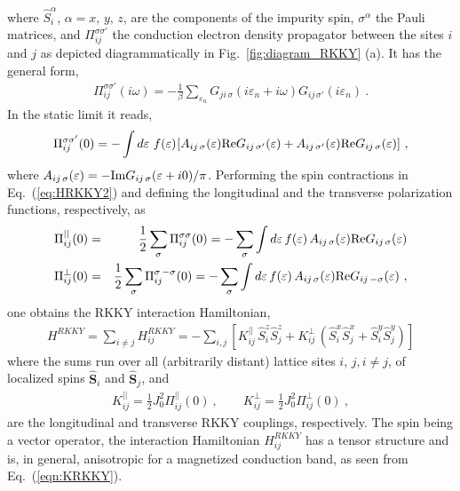 \documentclass[12pt,twoside]{article}
\newcommand{\ve}[1]{\mathbf{#1}}
\begin{document}
where $\hat{S}^{\alpha}_{i}$, $\alpha=x,\,y,\,z$, are the components of the 
impurity spin, $\sigma^{\alpha}$ the Pauli matrices, and 
$\Pi_{ij}^{\sigma\sigma'}$ the conduction electron density propagator 
between the sites $i$ and $j$ as depicted diagrammatically 
in Fig.~\ref{fig:diagram_RKKY} (a). It has the general form,
\begin{eqnarray} 
\Pi_{ij}^{\sigma\sigma'}(i\omega) = -\frac{1}{\beta}\sum_{\varepsilon_n}
G_{ji\,\sigma}(i\varepsilon_n+i\omega) G_{ij\,\sigma'}(i\varepsilon_n) \ .
\label{eq:Pi_general} 
\end{eqnarray}
In the static limit it reads, 
\begin{eqnarray}
\Pi_{ij}^{\sigma\sigma'}(0) = - \int d\varepsilon\  f(\varepsilon)\,
\hspace*{-0.1cm}\left[
A_{ij\,\sigma}(\varepsilon) {\rm Re} G_{ij\,\sigma'}(\varepsilon) +
A_{ij\,\sigma'}(\varepsilon) {\rm Re} G_{ij\,\sigma}(\varepsilon) 
\right] \,,  \nonumber
\end{eqnarray}
where $A_{ij\,\sigma}(\varepsilon) = -{\rm Im}G_{ij\,\sigma}(\varepsilon +i0)/\pi$. 
Performing the spin contractions in Eq.~(\ref{eq:HRKKY2}) and 
defining the longitudinal and the transverse polarization functions,
respectively, as
\begin{eqnarray}
\Pi_{ij}^{||}(0)   &=& \frac{1}{2}\sum_{\sigma} \Pi_{ij}^{\sigma\sigma}(0)
= - \sum_{\sigma}\int d\varepsilon\,  f(\varepsilon)\,
A_{ij\,\sigma}(\varepsilon) {\rm Re} G_{ij\,\sigma}(\varepsilon)\\
\Pi_{ij}^{\perp}(0) &=& \frac{1}{2}\sum_{\sigma} \Pi_{ij}^{\sigma\,-\sigma}(0) 
= - \sum_{\sigma}\int d\varepsilon\,  f(\varepsilon)\,
A_{ij\,\sigma}(\varepsilon) {\rm Re} G_{ij\,-\sigma}(\varepsilon) \ , 
\end{eqnarray}
one obtains the RKKY interaction Hamiltonian,  
\begin{eqnarray}\label{eqn:HRKKY3}
H^{RKKY} = \sum_{i\neq j} H^{RKKY}_{ij} 
= - \sum_{i,j} \left[ K_{ij}^{||}\,  \hat{S}_i^z \hat{S}_j^z 
             + K_{ij}^{\perp}\, \left(\hat{S}_i^x\hat{S}_j^x + 
                                   \hat{S}_i^y\hat{S}_j^y\right)\right] 
\nonumber
\end{eqnarray}
\vspace*{0.2cm}\noindent
where the sums run over all (arbitrarily distant) 
lattice sites $i,\,j, i\neq j$, of localized spins 
$\hat{\ve{S}}_i$ and $\hat{\ve{S}}_j$, and
\begin{eqnarray}\label{eqn:KRKKY}
K_{ij}^{||}   =   \frac{1}{2} J_{0}^2  \Pi_{ij}^{||}(0) \ , \qquad
K_{ij}^{\perp} = \frac{1}{2} J_{0}^2 \Pi_{ij}^{\perp}(0) \ , 
\end{eqnarray}
are the longitudinal and transverse RKKY couplings,
respectively. 
The spin being a vector operator, the interaction Hamiltonian 
$H^{RKKY}_{ij}$ has a tensor structure and is, in general, anisotropic
for a magnetized conduction band, as seen from Eq.~(\ref{eqn:KRKKY}).
\end{document}
